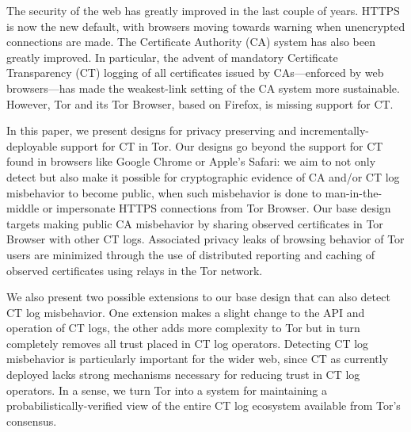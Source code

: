 The security of the web has greatly improved in the last couple of years. HTTPS
is now the new default, with browsers moving towards warning when unencrypted
connections are made. The Certificate Authority (CA) system has also been
greatly improved. In particular, the advent of mandatory Certificate
Transparency (CT) logging of all certificates issued by CAs---enforced by web
browsers---has made the weakest-link setting of the CA system more sustainable.
However, Tor and its Tor Browser, based on Firefox, is missing support for CT.

In this paper, we present designs for privacy preserving and
incrementally-deployable support for CT in Tor. Our designs go beyond the
support for CT found in browsers like Google Chrome or Apple's Safari: we aim to
not only detect but also make it possible for cryptographic evidence of CA
and/or CT log misbehavior to become public, when such misbehavior is done to
man-in-the-middle or impersonate HTTPS connections from Tor Browser. Our base
design targets making public CA misbehavior by sharing observed certificates in
Tor Browser with other CT logs. Associated privacy leaks of browsing behavior of
Tor users are minimized through the use of distributed reporting and caching of
observed certificates using relays in the Tor network.

We also present two possible extensions to our base design that can also detect
CT log misbehavior. One extension makes a slight change to the API and operation
of CT logs, the other adds more complexity to Tor but in turn completely removes
all trust placed in CT log operators. Detecting CT log misbehavior is
particularly important for the wider web, since CT as currently deployed lacks
strong mechanisms necessary for reducing trust in CT log operators. In a sense,
we turn Tor into a system for maintaining a probabilistically-verified view of
the entire CT log ecosystem available from Tor’s consensus.